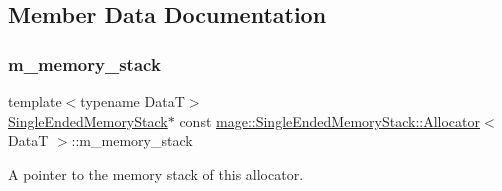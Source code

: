 \subsection{Member Data Documentation}
\hypertarget{structmage_1_1_single_ended_memory_stack_1_1_allocator_a15ef2935cbc1a207892f25148c05c45d}{}\label{structmage_1_1_single_ended_memory_stack_1_1_allocator_a15ef2935cbc1a207892f25148c05c45d} 
\subsubsection{\texorpdfstring{m\+\_\+memory\+\_\+stack}{m\_memory\_stack}}
{\footnotesize\ttfamily template$<$typename DataT$>$ \\
\hyperlink{classmage_1_1_single_ended_memory_stack}{Single\+Ended\+Memory\+Stack}$\ast$ const \hyperlink{structmage_1_1_single_ended_memory_stack_1_1_allocator}{mage\+::\+Single\+Ended\+Memory\+Stack\+::\+Allocator}$<$ DataT $>$\+::m\+\_\+memory\+\_\+stack\hspace{0.3cm}{\ttfamily [private]}}

A pointer to the memory stack of this allocator. 